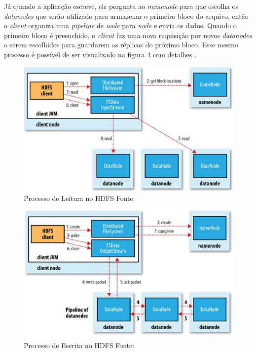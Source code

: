                 Já quando a aplicação escreve, ele pergunta ao \textit{namenode} para que escolha os \textit{datanodes}
                que serão utilizado para armazenar o primeiro bloco do arquivo, então o \textit{client} organiza uma
                \textit{pipeline} de \textit{node} para \textit{node} e envia os dados. Quando o primeiro bloco é preenchido,
                o \textit{client} faz uma nova requisição por novos \textit{datanodes} a serem escolhidos para guardarem
                as réplicas do próximo bloco. Esse mesmo processo é possível de ser visualizado na figura 4 com detalhes
                \cite{shvachko2010}.

                \begin{figure}[ht!]
                    \centering
                    \includegraphics[keepaspectratio=true,scale=0.75]
                        {figuras/figura3.eps}
                    \caption[Processo de Leitura no HDFS]{Processo de Leitura no HDFS
                    \protect\linebreak Fonte: }
                    \label{figura3}
                \end{figure}

                \begin{figure}[ht!]
                    \centering
                    \includegraphics[keepaspectratio=true,scale=0.75]
                        {figuras/figura4.eps}
                    \caption[Processo de Escrita no HDFS]{Processo de Escrita no HDFS
                    \protect\linebreak Fonte: }
                    \label{figura4}
                \end{figure}

